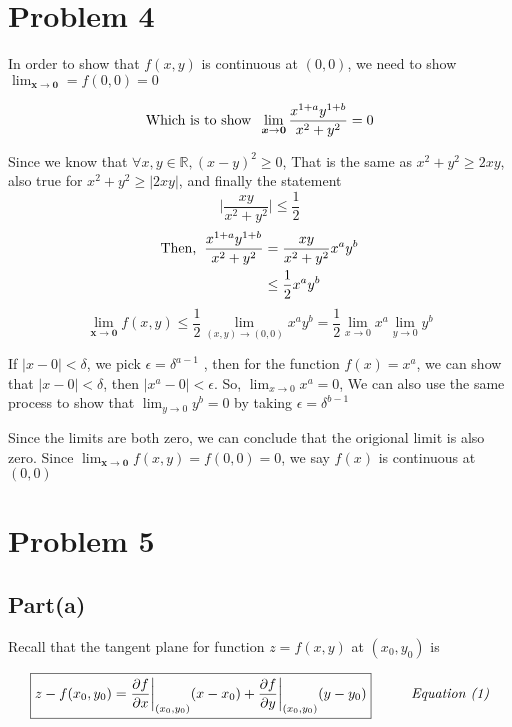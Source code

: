 \documentclass[12pt]{article}
\renewcommand{\vec}[1]{\boldsymbol{#1}}
\begin{document}
\newpage
\section*{Problem 4}

In order to show that $f(x,y)$ is continuous at $(0,0)$, we need to show
$\lim_{\vec x \rightarrow \vec 0} = f(0,0) = 0 $

\[ \text{Which is to show} \hspace*{0.2cm}
 \lim_{\vec x \rightarrow \vec 0} \frac{x^{1+a}y^{1+b}}{x^2+y^2}
 = 0\]

Since we know that $\forall x,y \in \mathbb{R} , (x-y)^2 \geq 0 $,
That is the same as $x^2 + y^2 \geq 2xy$, also true for 
$ x^2 + y^2 \geq \vert 2xy \vert $, and finally the statement
\[ \bigl\lvert \frac{xy}{x^2 + y^2} \bigr\rvert \leq \frac{1}{2} \]
\begin{align*} 
    \text{Then,} \hspace*{0.2cm} \frac{x^{1+a}y^{1+b}}{x^2 + y^2}
    &= \frac{xy}{x^2 + y^2}x^ay^b \\
    & \leq \frac{1}{2}x^a y^b
\end{align*}
\[ \lim_{\vec x \rightarrow \vec 0}f(x,y) \leq 
\frac{1}{2}\lim_{(x,y) \rightarrow (0,0)} x^a y^b =
\frac{1}{2}\lim_{x \rightarrow 0}x^a \lim_{y \rightarrow 0}y^b \]

If $\vert x - 0 \vert < \delta$, we pick $\epsilon = \delta^{a-1}$
, then for the function $f(x)=x^a$, we can show that $\vert x-0\vert
< \delta$, then $\vert x^a - 0 \vert < \epsilon $. 
So, $\lim_{x \rightarrow 0}x^a = 0$, We can also use the same process
to show that $\lim_{y\rightarrow 0}y^b = 0$ by taking $ \epsilon
= \delta^{b-1}$

Since the limits are both zero, we can conclude that the origional
limit is also zero. Since $\lim_{\vec x \rightarrow \vec 0}f(x,y)
= f(0,0) = 0$, we say $f(x)$ is continuous at $(0,0)$
 



\newpage
\section*{Problem 5}

\subsection*{Part(a)}
Recall that the tangent plane for function $z = f(x,y)$ at $(x_0,y_0)$
is

\[ \boxed{z - f(x_0,y_0) = \frac{\partial f}{\partial x}\bigg|_{(x_0,y_0)}(x-x_0)
+ \frac{\partial f}{\partial y}\bigg|_{(x_0,y_0)}(y-y_0)} \hspace*{1cm} \textit{Equation (1)}\]
\end{document}
